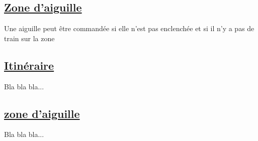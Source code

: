 \subsection{\underline{Zone d'aiguille}}
\label{sec:aig}

Une aiguille peut être commandée si elle n'est pas enclenchée et si il n'y a pas de train
sur la zone 


\subsection{\underline{Itinéraire}}
\label{sec:iti}

Bla bla bla...

\subsection{\underline{zone d'aiguille}}
\label{sec:aig}

Bla bla bla...



\newpage





